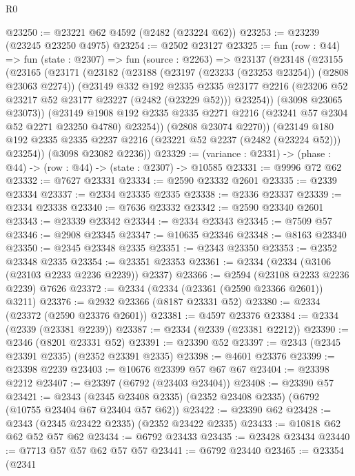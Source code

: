 \begin{lexlean}{R0}
\begin{coremodule}
@23250 := @23221 @62 @4592 (@2482 (@23224 @62))
@23253 := @23239 (@23245 @23250 @4975)
@23254 := @2502 @23127
@23325 := fun (row : @44) =>
  fun (state : @2307) =>
  fun (source : @2263) =>
  @23137
    (@23148
      (@23155
        (@23165
          (@23171
            (@23182
              (@23188
                (@23197 (@23233 (@23253 @23254)) (@2808 @23063 @2274))
                (@23149
                  @332
                  @192
                  @2335
                  @2335
                  @23177
                  @2216
                  (@23206 @52 @23217 @52 @23177 @23227 (@2482 (@23229 @52)))
                  @23254))
              (@3098 @23065 @23073))
            (@23149
              @1908
              @192
              @2335
              @2335
              @2271
              @2216
              (@23241 @57 @2304 @52 @2271 @23250 @4780)
              @23254))
          (@2808 @23074 @2270))
        (@23149 @180 @192 @2335 @2335 @2237 @2216 (@23221 @52 @2237 (@2482 (@23224 @52))) @23254))
      (@3098 @23082 @2236))
@23329 := (variance : @2331) -> (phase : @44) -> (row : @44) -> (state : @2307) -> @10585
@23331 := @9996 @72 @62
@23332 := @7627 @23331
@23334 := @2590 @23332 @2601
@23335 := @2339 @23334
@23337 := @2334 @23335 @2335
@23338 := @2336 @23337
@23339 := @2334 @23338
@23340 := @7636 @23332
@23342 := @2590 @23340 @2601
@23343 := @23339 @23342
@23344 := @2334 @23343
@23345 := @7509 @57
@23346 := @2908 @23345
@23347 := @10635 @23346
@23348 := @8163 @23340
@23350 := @2345 @23348 @2335
@23351 := @2343 @23350
@23353 := @2352 @23348 @2335
@23354 := @23351 @23353
@23361 := @2334 (@2334 (@3106 (@23103 @2233 @2236 @2239)) @2337)
@23366 := @2594 (@23108 @2233 @2236 @2239) @7626
@23372 := @2334 (@2334 (@23361 (@2590 @23366 @2601)) @3211)
@23376 := @2932 @23366 (@8187 @23331 @52)
@23380 := @2334 (@23372 (@2590 @23376 @2601))
@23381 := @4597 @23376
@23384 := @2334 (@2339 (@23381 @2239))
@23387 := @2334 (@2339 (@23381 @2212))
@23390 := @2346 (@8201 @23331 @52)
@23391 := @23390 @52
@23397 := @2343 (@2345 @23391 @2335) (@2352 @23391 @2335)
@23398 := @4601 @23376
@23399 := @23398 @2239
@23403 := @10676 @23399 @57 @67 @67
@23404 := @23398 @2212
@23407 := @23397 (@6792 (@23403 @23404))
@23408 := @23390 @57
@23421 := @2343 (@2345 @23408 @2335) (@2352 @23408 @2335) (@6792 (@10755 @23404 @67 @23404 @57 @62))
@23422 := @23390 @62
@23428 := @2343 (@2345 @23422 @2335) (@2352 @23422 @2335)
@23433 := @10818 @62 @62 @52 @57 @62
@23434 := @6792 @23433
@23435 := @23428 @23434
@23440 := @7713 @57 @57 @62 @57 @57
@23441 := @6792 @23440
@23465 := @23354
    (@2341

\end{coremodule}
\end{lexlean}
